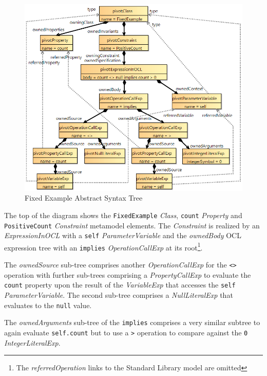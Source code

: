 \documentclass[
]{ceurart}
\begin{document}
\begin{figure}
	\vspace{-10pt}
	\begin{center}
		\includegraphics[width=4.5in]{FixedExampleAST.png}
	\end{center}
	\vspace{-10pt}
	\caption{Fixed Example Abstract Syntax Tree}
	\label{fig:FixedExampleAST}
	\vspace{-10pt}
\end{figure}

The top of the diagram shows the \verb|FixedExample| \emph{Class}, \verb|count| \emph{Property} and \verb|PositiveCount| \emph{Constraint} metamodel elements. The \emph{Constraint} is realized by an \emph{ExpressionInOCL} with a \verb|self| \emph{ParameterVariable} and the \emph{ownedBody} OCL expression tree with an \verb|implies| \emph{OperationCallExp} at its root\footnote{The \emph{referredOperation} links to the Standard Library model are omitted}.

The \emph{ownedSource} sub-tree comprises another \emph{OperationCallExp} for the \verb|<>| operation with further sub-trees comprising a \emph{PropertyCallExp} to evaluate the \verb|count| property upon the result of the \emph{VariableExp} that accesses the \verb|self| \emph{ParameterVariable}. The second sub-tree comprises a \emph{NullLiteralExp} that evaluates to the \verb|null| value.

The \emph{ownedArguments} sub-tree of the \verb|implies| comprises a very similar subtree to again evaluate \verb|self.count| but to use a \verb|>| operation to compare against the \verb|0| \emph{IntegerLiteralExp}.
\end{document}
